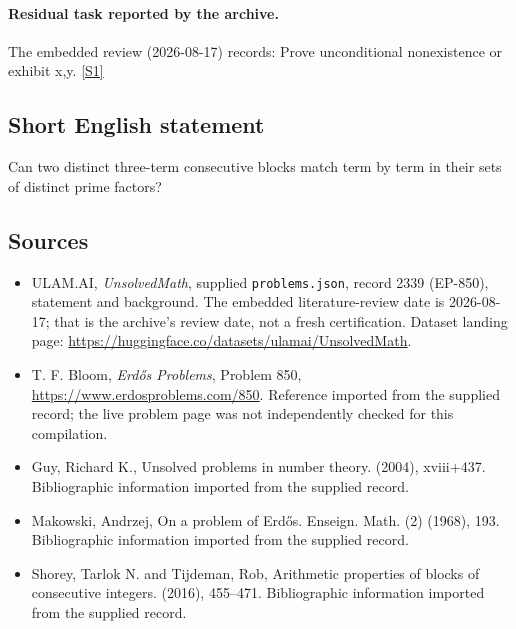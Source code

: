 \documentclass[11pt,a4paper]{article}
\newcommand{\sref}[2]{\hyperlink{source:#1:#2}{[S#2]}}
\begin{document}
\paragraph{Residual task reported by the archive.}

The embedded review (2026-08-17) records: Prove unconditional nonexistence or exhibit x,y. \sref{2339}{1}

\subsection{Short English statement}

Can two distinct three-term consecutive blocks match term by term in their sets of distinct prime factors?

\subsection{Sources}

{\small

\begin{itemize}

\item[\hypertarget{source:2339:1}{S1}] ULAM.AI, \emph{UnsolvedMath}, supplied \texttt{problems.json}, record 2339 (EP-850), statement and background. The embedded literature-review date is 2026-08-17; that is the archive’s review date, not a fresh certification. Dataset landing page: \url{https://huggingface.co/datasets/ulamai/UnsolvedMath}.

\item[\hypertarget{source:2339:2}{S2}] T. F. Bloom, \emph{Erdős Problems}, Problem 850, \url{https://www.erdosproblems.com/850}. Reference imported from the supplied record; the live problem page was not independently checked for this compilation.

\item[\hypertarget{source:2339:3}{S3}] Guy, Richard K., Unsolved problems in number theory. (2004), xviii+437. Bibliographic information imported from the supplied record.

\item[\hypertarget{source:2339:4}{S4}] Makowski, Andrzej, On a problem of {E}rd\H{o}s. Enseign. Math. (2) (1968), 193. Bibliographic information imported from the supplied record.

\item[\hypertarget{source:2339:5}{S5}] Shorey, Tarlok N. and Tijdeman, Rob, Arithmetic properties of blocks of consecutive integers. (2016), 455--471. Bibliographic information imported from the supplied record.

\end{itemize}

}

\label{end:2339}
\end{document}
